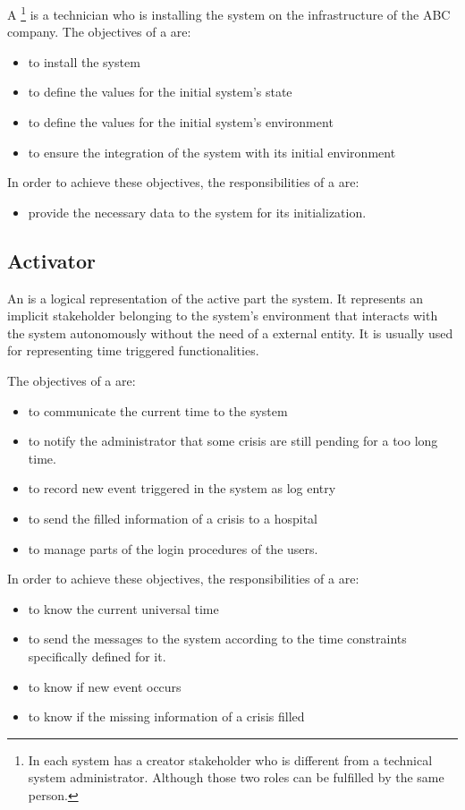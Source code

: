 A \footnote{In \msrmessir each system has a creator stakeholder who is different from a technical system administrator. Although those two roles can be fulfilled by the same person.} is a technician who is installing the \msricrash system on the infrastructure of the ABC company.
The objectives of a  are:
\begin{itemize}
  \item to install the \msricrash system
  \item to define the values for the initial system's state
  \item to define the values for the initial system's environment
  \item to ensure the integration of the \msricrash system with its initial environment
\end{itemize}
\vspace{0.5cm}
In order to achieve these objectives, the responsibilities of a  are:
\begin{itemize}
  \item provide the necessary data to the \msricrash system for its initialization.
\end{itemize}

\subsection{Activator}

An  is a logical representation of the active part the \msricrash system. It represents an implicit stakeholder belonging to the system's environment that interacts with the \msricrash system autonomously without the need of a external entity. It is usually used for representing time triggered functionalities.

The objectives of a  are:
\begin{itemize}
  \item to communicate the current time to the system
  \item to notify the administrator that some crisis are still pending for a too long time.
  \item to record new event triggered in the system as log entry
  \item to send the filled information of a crisis to a hospital
  \item to manage parts of the login procedures of the users.
\end{itemize}
\vspace{0.5cm}
In order to achieve these objectives, the responsibilities of a  are:
\begin{itemize}
  \item to know the current universal time
  \item to send the messages to the system according to the time constraints specifically defined for it.
  \item to know if new event occurs
  \item to know if the missing information of a crisis filled
\end{itemize}

